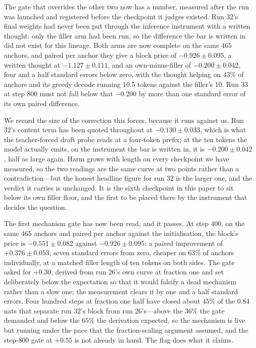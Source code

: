 \documentclass{article} %
\begin{document}
The gate that overrides the other two now has a number, measured after the run was launched and
registered before the checkpoint it judges existed. Run 32's final weights had never been put
through the inference instrument with a written thought: only the filler arm had been run, so the
difference the bar is written in did not exist for this lineage. Both arms are now complete on the
same $465$ anchors, and paired per anchor they give a block price of $-0.926 \pm 0.095$, a written
thought at $-1.127 \pm 0.111$, and an own-minus-filler of $-0.200 \pm 0.042$, four and a half
standard errors below zero, with the thought helping on $43\%$ of anchors and its greedy decode
running $10.5$ tokens against the filler's $10$. Run 33 at step $800$ must not fall below that
$-0.200$ by more than one standard error of its own paired difference.

We record the size of the correction this forces, because it runs against us. Run 32's content term
has been quoted throughout at $-0.130 \pm 0.033$, which is what the teacher-forced draft probe reads
at a four-token prefix; at the ten tokens the model actually emits, on the instrument the bar is
written in, it is $-0.200 \pm 0.042$, half as large again. Harm grows with length on every
checkpoint we have measured, so the two readings are the same curve at two points rather than a
contradiction---but the honest headline figure for run 32 is the larger one, and the verdict it
carries is unchanged. It is the sixth checkpoint in this paper to sit below its own filler floor,
and the first to be placed there by the instrument that decides the question.

The first mechanism gate has now been read, and it passes. At step $400$, on the same $465$ anchors
and paired per anchor against the initialisation, the block's price is $-0.551 \pm 0.082$ against
$-0.926 \pm 0.095$: a paired improvement of $+0.376 \pm 0.053$, seven standard errors from zero,
cheaper on $63\%$ of anchors individually, at a matched filler length of ten tokens on both sides.
The gate asked for $+0.30$, derived from run 26's own curve at fraction one and set deliberately
below the expectation so that it would falsify a dead mechanism rather than a slow one; the
measurement clears it by one and a half standard errors. Four hundred steps at fraction one half
have closed about $45\%$ of the $0.84$ nats that separate run 32's block from run 26's---above the
$36\%$ the gate demanded and below the $65\%$ the derivation expected, so the mechanism is live but
running under the pace that the fraction-scaling argument assumed, and the step-$800$ gate at
$+0.55$ is not already in hand. The flag does what it claims.
\end{document}

